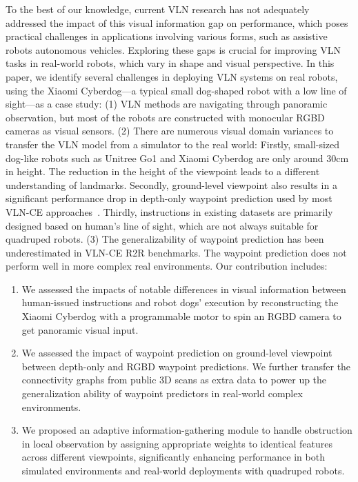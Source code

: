 To the best of our knowledge, current VLN research has not adequately addressed the impact of this visual information gap on performance, which poses practical challenges in applications involving various forms, such as assistive robots autonomous vehicles. Exploring these gaps is crucial for improving VLN tasks in real-world robots, which vary in shape and visual perspective. In this paper, we identify several challenges in deploying VLN systems on real robots, using the Xiaomi Cyberdog—a typical small dog-shaped robot with a low line of sight—as a case study:
(1) VLN methods are navigating through panoramic observation, but most of the robots are constructed with monocular RGBD cameras as visual sensors. 
(2) There are numerous visual domain variances to transfer the VLN model from a simulator to the real world:
Firstly, small-sized dog-like robots such as Unitree Go1 and Xiaomi Cyberdog are only around 30cm in height. The reduction in the height of the viewpoint leads to a different understanding of landmarks.
Secondly, ground-level viewpoint also results in a significant performance drop in depth-only waypoint prediction used by most VLN-CE approaches~\cite{an2022bevbert, wang2023gridmm, an2023etpnav}.
Thirdly, instructions in existing datasets are primarily designed based on human's line of sight, which are not always suitable for quadruped robots.
(3) The generalizability of waypoint prediction has been underestimated in VLN-CE R2R benchmarks. The waypoint prediction does not perform well in more complex real environments.
Our contribution includes:
\begin{enumerate}
\item We assessed the impacts of notable differences in visual information between human-issued instructions and robot dogs' execution by reconstructing the Xiaomi Cyberdog with a programmable motor to spin an RGBD camera to get panoramic visual input.
\item We assessed the impact of waypoint prediction on ground-level viewpoint between depth-only and RGBD waypoint predictions. We further transfer the connectivity graphs from public 3D scans as extra data to power up the generalization ability of waypoint predictors in real-world complex environments. 
\item We proposed an adaptive information-gathering module to handle obstruction in local observation by assigning appropriate weights to identical features across different viewpoints, significantly enhancing performance in both simulated environments and real-world deployments with quadruped robots.
\end{enumerate}